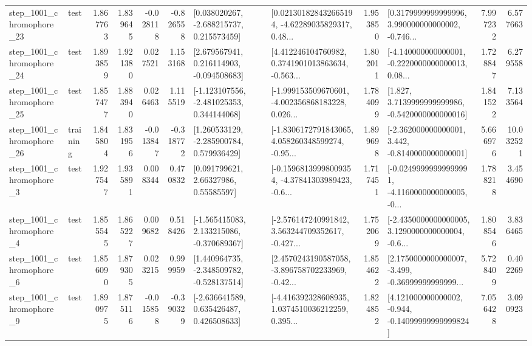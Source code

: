 \begin{tabular}{llrrrrllrlrr}
 step\_1001\_chromophore\_23 &      test &      1.867763 &    1.839645 &     -0.028118 & -0.826558 &    [0.038020267, -2.688215737, 0.215573459] &  [0.021301828432665194, -4.62289035829317, 0.48... &       1.953850 &  [0.3179999999999996, 3.990000000000002, -0.746... &            7.997232 &          6.577663 \\
 step\_1001\_chromophore\_24 &      test &      1.893859 &    1.921380 &      0.027521 &  1.153168 &    [2.679567941, 0.216114903, -0.094508683] &  [4.412246104760982, 0.3741901013863634, -0.563... &       1.802011 &  [-4.140000000000001, -0.2220000000000013, 0.08... &            1.728847 &          6.279558 \\
 step\_1001\_chromophore\_25 &      test &      1.857477 &    1.883940 &      0.026463 &  1.115519 &   [-1.123107556, -2.481025353, 0.344144068] &  [-1.999153509670601, -4.002356868183228, 0.026... &       1.784099 &   [1.827, 3.7139999999999986, -0.5420000000000016] &            1.841522 &          7.133564 \\
 step\_1001\_chromophore\_26 &  training &      1.845804 &    1.831956 &     -0.013847 & -0.318772 &    [1.260533129, -2.285900784, 0.579936429] &  [-1.8306172791843065, 4.058260348599274, -0.95... &       1.899698 &   [-2.362000000000001, 3.442, -0.8140000000000001] &            5.666976 &         10.032521 \\
  step\_1001\_chromophore\_3 &      test &      1.927547 &    1.935891 &      0.008344 &  0.470832 &       [0.091799621, 2.66327986, 0.55585597] &  [-0.15968139998009354, -4.37841303989423, -0.6... &       1.717451 &  [-0.02499999999999991, -4.1160000000000005, -0... &            1.788218 &          3.454690 \\
  step\_1001\_chromophore\_4 &      test &      1.855545 &    1.865227 &      0.009682 &  0.518426 &   [-1.565415083, 2.133215086, -0.370689367] &  [-2.576147240991842, 3.563244709352617, -0.427... &       1.752069 &  [-2.4350000000000005, 3.1290000000000004, -0.6... &            1.808546 &          3.836465 \\
  step\_1001\_chromophore\_6 &      test &      1.856090 &    1.879305 &      0.023215 &  0.999959 &   [1.440964735, -2.348509782, -0.528137514] &  [2.4570243190587058, -3.896758702233969, -0.42... &       1.854622 &  [2.1750000000000007, -3.499, -0.36999999999999... &            5.728409 &          0.402269 \\
  step\_1001\_chromophore\_9 &      test &      1.890975 &    1.875116 &     -0.015858 & -0.390329 &    [-2.636641589, 0.635426487, 0.426508633] &  [-4.416392328608935, 1.0374510036212259, 0.395... &       1.824852 &  [4.121000000000002, -0.944, -0.14099999999999824] &            7.056428 &          3.090923 \\

\end{tabular}
